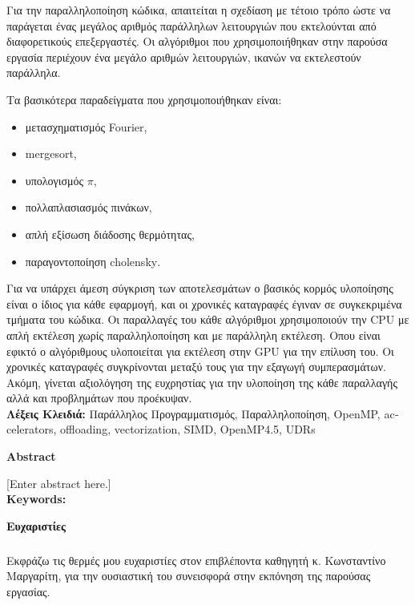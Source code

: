 \documentclass[12pt]{article}
\newcommand{\en}[1]{\foreignlanguage{english}{#1}}
\begin{document}
Για την παραλληλοποίηση κώδικα, απαιτείται η σχεδίαση με τέτοιο τρόπο ώστε να παράγεται ένας μεγάλος αριθμός παράλληλων λειτουργιών που εκτελούνται από διαφορετικούς επεξεργαστές. Οι  αλγόριθμοι που χρησιμοποιήθηκαν στην παρούσα εργασία περιέχουν ένα μεγάλο αριθμών λειτουργιών, ικανών να εκτελεστούν παράλληλα. 

Τα βασικότερα παραδείγματα που χρησιμοποιήθηκαν είναι:
\begin{itemize}
    \item μετασχηματισμός \en{Fourier}, 
    \item \en{mergesort},
    \item υπολογισμός $\pi$, 
    \item πολλαπλασιασμός πινάκων,
    \item απλή εξίσωση διάδοσης θερμότητας,
    \item παραγοντοποίηση \en{cholensky}.
\end{itemize}

      
Για να υπάρχει άμεση σύγκριση των αποτελεσμάτων ο βασικός κορμός υλοποίησης είναι ο ίδιος για κάθε εφαρμογή, και οι χρονικές καταγραφές έγιναν σε συγκεκριμένα τμήματα του κώδικα. Οι παραλλαγές του κάθε αλγόριθμοι χρησιμοποιούν την \en{CPU} με απλή εκτέλεση χωρίς παραλληλοποίηση και με παράλληλη εκτέλεση. Οπου είναι εφικτό ο αλγόριθμους υλοποιείται  για εκτέλεση στην \en{GPU} για την επίλυση του. Οι χρονικές καταγραφές συγκρίνονται μεταξύ τους για την εξαγωγή συμπερασμάτων. Ακόμη, γίνεται αξιολόγηση της ευχρηστίας για την υλοποίηση της κάθε παραλλαγής αλλά και προβλημάτων που προέκυψαν.\\[1 cm]

\indent \textbf{Λέξεις Κλειδιά:}
Παράλληλος Προγραμματισμός, Παραλληλοποίηση, \en{OpenMP, accelerators, offloading, vectorization, SIMD, OpenMP4.5, UDRs}

\clearpage
{}
\begin{flushleft}

{\large \textbf{Abstract}}\\[0.5 cm]
\end{flushleft}
[Enter abstract here.]\\[1 cm]
\indent \textbf{Keywords:}

\clearpage
{}
\begin{flushleft}
{\large \textbf{Ευχαριστίες}}\\[0.5 cm]
\end{flushleft}
\subparagraph{}
Εκφράζω τις θερμές μου ευχαριστίες στον επιβλέποντα καθηγητή κ. Κωνσταντίνο Μαργαρίτη, για την ουσιαστική του συνεισφορά στην εκπόνηση της παρούσας εργασίας.
\end{document}
